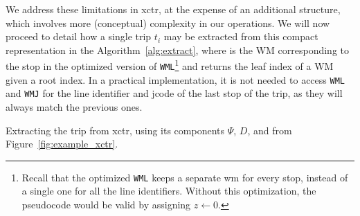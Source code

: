 	We address these limitations in \gls{xctr}, at the expense of an additional structure, which involves more (conceptual) complexity in our operations. We will now proceed to detail how a single trip $t_i$ may be extracted from this compact representation
	in the Algorithm~\ref{alg:extract}, where 
	 is the WM corresponding to the stop  in the optimized version of \texttt{WML}\footnote{Recall that the optimized \texttt{WML} keeps a separate \gls{wm} for every stop, instead of a single one for all the line identifiers. Without this optimization, the pseudocode would be valid by assigning $z\leftarrow 0$.} and  returns the leaf index of a WM given a root index. In a practical implementation, it is not needed to access \texttt{WML} and \texttt{WMJ} for the line identifier and jcode of the last stop of the trip, as they will always match the previous ones.
	
	\begin{algorithm}[h!]
     
     
     \caption{Extracting the trip  from \acrshort{xctr}, using its components $\Psi$, $D$,  and  from Figure~\ref{fig:example_xctr}.}
     \label{alg:extract}
    \end{algorithm}
    

